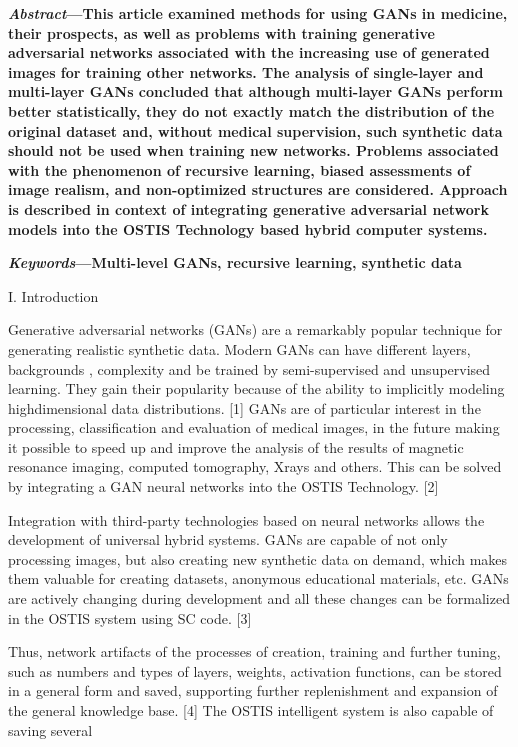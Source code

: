 \documentclass[twocolumn, 10pt]{article}
\begin{document}
\begin{multicols}{2}

\small{\textbf{\textit{Abstract}—This article examined methods for using GANs
in medicine, their prospects, as well as problems with
training generative adversarial networks associated with
the increasing use of generated images for training other
networks. The analysis of single-layer and multi-layer GANs
concluded that although multi-layer GANs perform better
statistically, they do not exactly match the distribution
of the original dataset and, without medical supervision,
such synthetic data should not be used when training new
networks. Problems associated with the phenomenon of
recursive learning, biased assessments of image realism,
and non-optimized structures are considered. Approach is
described in context of integrating generative adversarial
network models into the OSTIS Technology based hybrid
computer systems.}

\textbf{\textit{Keywords}—Multi-level GANs, recursive learning, synthetic data}}

\normalsize 
\centerline{I. Introduction}

Generative adversarial networks (GANs) are a remarkably popular technique for generating realistic synthetic
data. Modern GANs can have different layers, backgrounds , complexity and be trained by semi-supervised
and unsupervised learning. They gain their popularity because of the ability to implicitly modeling highdimensional data distributions. [1] GANs are of particular interest in the processing, classification and evaluation
of medical images, in the future making it possible to
speed up and improve the analysis of the results of
magnetic resonance imaging, computed tomography, Xrays and others. This can be solved by integrating a GAN
neural networks into the OSTIS Technology. [2]

Integration with third-party technologies based on
neural networks allows the development of universal
hybrid systems. GANs are capable of not only processing
images, but also creating new synthetic data on demand, which makes them valuable for creating datasets,
anonymous educational materials, etc. GANs are actively
changing during development and all these changes can
be formalized in the OSTIS system using SC code. [3]

Thus, network artifacts of the processes of creation,
training and further tuning, such as numbers and types
of layers, weights, activation functions, can be stored in a
general form and saved, supporting further replenishment
and expansion of the general knowledge base. [4] The
OSTIS intelligent system is also capable of saving several
\columnbreak



\end{multicols}
\end{document}
